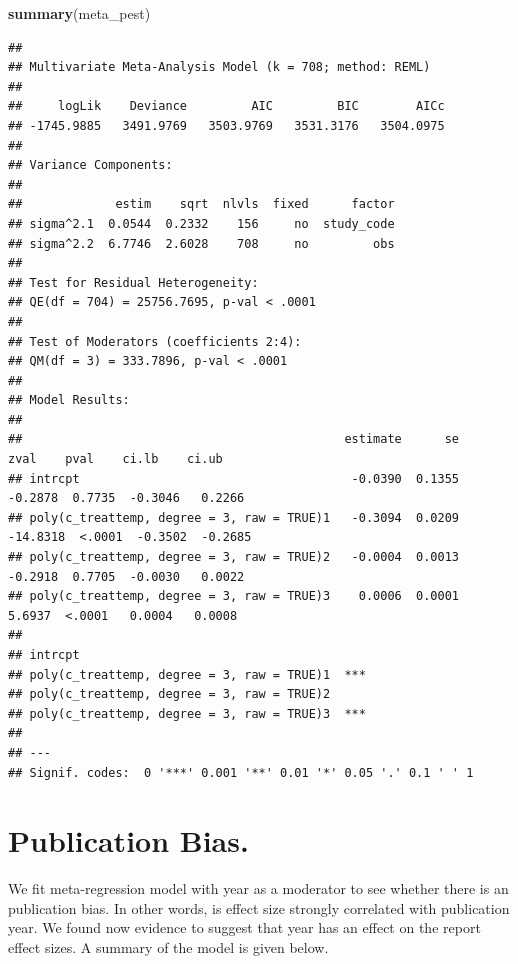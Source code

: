 \documentclass[
]{article}
\newenvironment{Shaded}{\begin{snugshade}}{\end{snugshade}}
\newcommand{\FunctionTok}[1]{\textcolor[rgb]{0.13,0.29,0.53}{\textbf{#1}}}
\newcommand{\NormalTok}[1]{#1}
\begin{document}
\begin{Shaded}
\begin{Highlighting}[]
\FunctionTok{summary}\NormalTok{(meta\_pest)}
\end{Highlighting}
\end{Shaded}

\begin{verbatim}
## 
## Multivariate Meta-Analysis Model (k = 708; method: REML)
## 
##     logLik    Deviance         AIC         BIC        AICc   
## -1745.9885   3491.9769   3503.9769   3531.3176   3504.0975   
## 
## Variance Components:
## 
##             estim    sqrt  nlvls  fixed      factor 
## sigma^2.1  0.0544  0.2332    156     no  study_code 
## sigma^2.2  6.7746  2.6028    708     no         obs 
## 
## Test for Residual Heterogeneity:
## QE(df = 704) = 25756.7695, p-val < .0001
## 
## Test of Moderators (coefficients 2:4):
## QM(df = 3) = 333.7896, p-val < .0001
## 
## Model Results:
## 
##                                             estimate      se      zval    pval    ci.lb    ci.ub 
## intrcpt                                      -0.0390  0.1355   -0.2878  0.7735  -0.3046   0.2266 
## poly(c_treattemp, degree = 3, raw = TRUE)1   -0.3094  0.0209  -14.8318  <.0001  -0.3502  -0.2685 
## poly(c_treattemp, degree = 3, raw = TRUE)2   -0.0004  0.0013   -0.2918  0.7705  -0.0030   0.0022 
## poly(c_treattemp, degree = 3, raw = TRUE)3    0.0006  0.0001    5.6937  <.0001   0.0004   0.0008 
##                                                 
## intrcpt                                         
## poly(c_treattemp, degree = 3, raw = TRUE)1  *** 
## poly(c_treattemp, degree = 3, raw = TRUE)2      
## poly(c_treattemp, degree = 3, raw = TRUE)3  *** 
## 
## ---
## Signif. codes:  0 '***' 0.001 '**' 0.01 '*' 0.05 '.' 0.1 ' ' 1
\end{verbatim}

\newpage

\hypertarget{publication-bias.}{%
\section{Publication Bias.}\label{publication-bias.}}

We fit meta-regression model with year as a moderator to see whether
there is an publication bias. In other words, is effect size strongly
correlated with publication year. We found now evidence to suggest that
year has an effect on the report effect sizes. A summary of the model is
given below.
\end{document}
